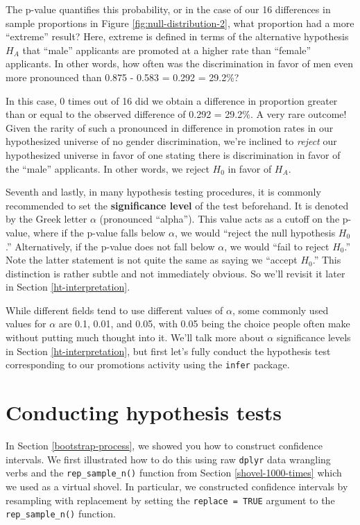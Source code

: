 \documentclass[
]{book}
\begin{document}
The p-value quantifies this probability, or in the case of our 16 differences in sample proportions in Figure \ref{fig:null-distribution-2}, what proportion had a more ``extreme'' result? Here, extreme is defined in terms of the alternative hypothesis \(H_A\) that ``male'' applicants are promoted at a higher rate than ``female'' applicants. In other words, how often was the discrimination in favor of men even more pronounced than 0.875 - 0.583 = 0.292 = 29.2\%?

In this case, 0 times out of 16 did we obtain a difference in proportion greater than or equal to the observed difference of 0.292 = 29.2\%. A very rare outcome! Given the rarity of such a pronounced in difference in promotion rates in our hypothesized universe of no gender discrimination, we're inclined to \emph{reject}  our hypothesized universe in favor of one stating there is discrimination in favor of the ``male'' applicants. In other words, we reject \(H_0\) in favor of \(H_A\).

Seventh and lastly, in many hypothesis testing procedures, it is commonly recommended to set the \textbf{significance level}  of the test beforehand. It is denoted by the Greek letter \(\alpha\) (pronounced ``alpha''). This value acts as a cutoff on the p-value, where if the p-value falls below \(\alpha\), we would ``reject the null hypothesis \(H_0\).'' Alternatively, if the p-value does not fall below \(\alpha\), we would ``fail to reject \(H_0\).'' Note the latter statement is not quite the same as saying we ``accept \(H_0\).'' This distinction is rather subtle and not immediately obvious. So we'll revisit it later in Section \ref{ht-interpretation}.

While different fields tend to use different values of \(\alpha\), some commonly used values for \(\alpha\) are 0.1, 0.01, and 0.05, with 0.05 being the choice people often make without putting much thought into it. We'll talk more about \(\alpha\) significance levels in Section \ref{ht-interpretation}, but first let's fully conduct the hypothesis test corresponding to our promotions activity using the \texttt{infer} package.

\hypertarget{ht-infer}{%
\section{Conducting hypothesis tests}\label{ht-infer}}

In Section \ref{bootstrap-process}, we showed you how to construct confidence intervals. We first illustrated how to do this using raw \texttt{dplyr} data wrangling verbs and the \texttt{rep\_sample\_n()} function from Section \ref{shovel-1000-times} which we used as a virtual shovel. In particular, we constructed confidence intervals by resampling with replacement by setting the \texttt{replace\ =\ TRUE} argument to the \texttt{rep\_sample\_n()} function.
\end{document}
